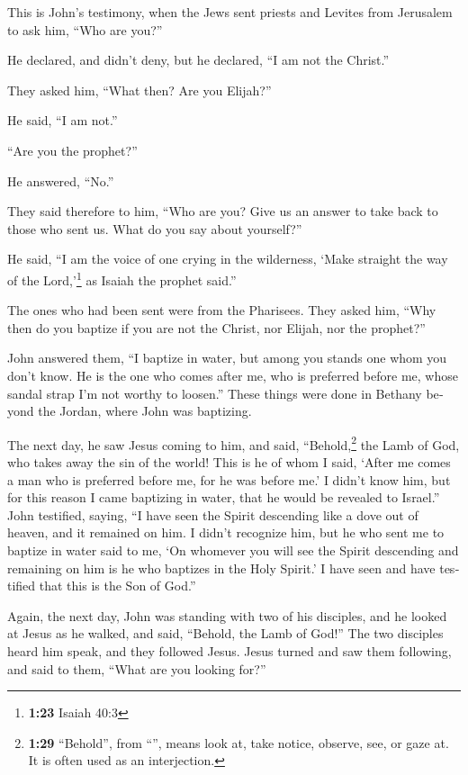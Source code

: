 \begin{paracol}{2}
\begin{otherlanguage}{english}
 This is John's testimony, when the Jews sent priests and
Levites from Jerusalem to ask him, ``Who are you?''

 He declared, and didn't deny, but he declared, ``I am
not the Christ.''

 They asked him, ``What then? Are you Elijah?''

He said, ``I am not.''

``Are you the prophet?''

He answered, ``No.''

 They said therefore to him, ``Who are you? Give us an
answer to take back to those who sent us. What do you say about
yourself?''

 He said, ``I am the voice of one crying in the
wilderness, `Make straight the way of the Lord,'\footnote{\textbf{1:23}
  Isaiah 40:3} as Isaiah the prophet said.''

 The ones who had been sent were from the Pharisees.
 They asked him, ``Why then do you baptize if you are not
the Christ, nor Elijah, nor the prophet?''

 John answered them, ``I baptize in water, but among you
stands one whom you don't know.  He is the one who comes
after me, who is preferred before me, whose sandal strap I'm not worthy
to loosen.''  These things were done in Bethany beyond
the Jordan, where John was baptizing.

 The next day, he saw Jesus coming to him, and said,
``Behold,\footnote{\textbf{1:29} ``Behold'', from ``'',
  means look at, take notice, observe, see, or gaze at. It is often used
  as an interjection.} the Lamb of God, who takes away the sin of the
world!  This is he of whom I said, `After me comes a man
who is preferred before me, for he was before me.'  I
didn't know him, but for this reason I came baptizing in water, that he
would be revealed to Israel.''  John testified, saying,
``I have seen the Spirit descending like a dove out of heaven, and it
remained on him.  I didn't recognize him, but he who sent
me to baptize in water said to me, `On whomever you will see the Spirit
descending and remaining on him is he who baptizes in the Holy Spirit.'
 I have seen and have testified that this is the Son of
God.''

 Again, the next day, John was standing with two of his
disciples,  and he looked at Jesus as he walked, and
said, ``Behold, the Lamb of God!''  The two disciples
heard him speak, and they followed Jesus.  Jesus turned
and saw them following, and said to them, ``What are you looking for?''


\end{otherlanguage}
\end{paracol}
